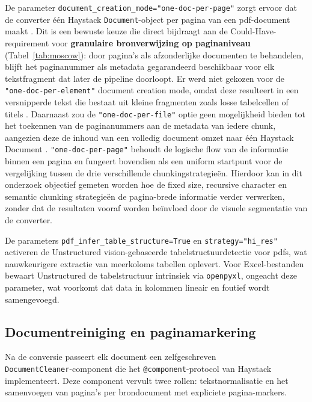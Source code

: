 De parameter \texttt{document_creation_mode="one-doc-per-page"} zorgt ervoor dat de converter één Haystack \texttt{Document}-object per pagina van een \gls{pdf}-document maakt \autocite{UnstructuredDocs2024}. Dit is een bewuste keuze die direct bijdraagt aan de Could-Have-requirement voor \textbf{granulaire bronverwijzing op paginaniveau} (Tabel~\ref{tab:moscow}): door pagina's als afzonderlijke documenten te behandelen, blijft het paginanummer als metadata gegarandeerd beschikbaar voor elk tekstfragment dat later de pipeline doorloopt. Er werd niet gekozen voor de \texttt{"one-doc-per-element"} document creation mode, omdat deze resulteert in een versnipperde tekst die bestaat uit kleine fragmenten zoals losse tabelcellen of titels \autocite{UnstructuredDocs2024}. Daarnaast zou de \texttt{"one-doc-per-file"} optie geen mogelijkheid bieden tot het toekennen van de paginanummers aan de metadata van iedere chunk, aangezien deze de inhoud van een volledig document omzet naar één Haystack Document \autocite{UnstructuredDocs2024}. \texttt{"one-doc-per-page"} behoudt de logische flow van de informatie binnen een pagina en fungeert bovendien als een uniform startpunt voor de vergelijking tussen de drie verschillende chunkingstrategieën. Hierdoor kan in dit onderzoek objectief gemeten worden hoe de fixed size, recursive character en semantic chunking strategieën de pagina-brede informatie verder verwerken, zonder dat de resultaten vooraf worden beïnvloed door de visuele segmentatie van de converter.

De parameters \texttt{pdf_infer_table_structure=True} en \texttt{strategy="hi_res"} activeren de Unstructured vision-gebaseerde tabelstructuurdetectie voor \glspl{pdf}, wat nauwkeurigere extractie van meerkoloms tabellen oplevert. Voor Excel-bestanden bewaart Unstructured de tabelstructuur intrinsiek via \texttt{openpyxl}, ongeacht deze parameter, wat voorkomt dat data in kolommen lineair en foutief wordt samengevoegd.

\subsection{Documentreiniging en paginamarkering}
\label{subsec:documentcleaner}

Na de conversie passeert elk document een zelfgeschreven\\\texttt{DocumentCleaner}-component die het \texttt{@component}-protocol van Haystack implementeert. Deze component vervult twee rollen: tekstnormalisatie en het samenvoegen van pagina's per brondocument met expliciete pagina-markers.

